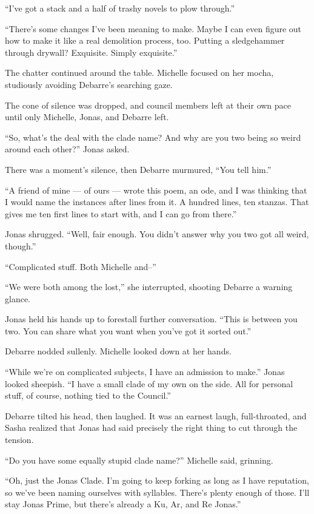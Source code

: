 ``I've got a stack and a half of trashy novels to plow through.''

``There's some changes I've been meaning to make. Maybe I can even figure out how to make it like a real demolition process, too. Putting a sledgehammer through drywall? Exquisite. Simply exquisite.''

The chatter continued around the table. Michelle focused on her mocha, studiously avoiding Debarre's searching gaze.

The cone of silence was dropped, and council members left at their own pace until only Michelle, Jonas, and Debarre left.

``So, what's the deal with the clade name? And why are you two being so weird around each other?'' Jonas asked.

There was a moment's silence, then Debarre murmured, ``You tell him.''

``A friend of mine — of ours — wrote this poem, an ode, and I was thinking that I would name the instances after lines from it. A hundred lines, ten stanzas. That gives me ten first lines to start with, and I can go from there.''

Jonas shrugged. ``Well, fair enough. You didn't answer why you two got all weird, though.''

``Complicated stuff. Both Michelle and--''

``We were both among the lost,'' she interrupted, shooting Debarre a warning glance.

Jonas held his hands up to forestall further conversation. ``This is between you two. You can share what you want when you've got it sorted out.''

Debarre nodded sullenly. Michelle looked down at her hands.

``While we're on complicated subjects, I have an admission to make.'' Jonas looked sheepish. ``I have a small clade of my own on the side. All for personal stuff, of course, nothing tied to the Council.''

Debarre tilted his head, then laughed. It was an earnest laugh, full-throated, and Sasha realized that Jonas had said precisely the right thing to cut through the tension.

``Do you have some equally stupid clade name?'' Michelle said, grinning.

``Oh, just the Jonas Clade. I'm going to keep forking as long as I have reputation, so we've been naming ourselves with syllables. There's plenty enough of those. I'll stay Jonas Prime, but there's already a Ku, Ar, and Re Jonas.''

